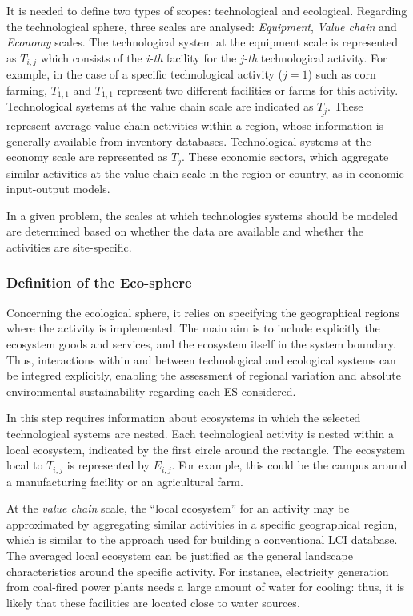 \documentclass[
  14pt,
]{extarticle}
\begin{document}
It is needed to define two types of scopes: technological and ecological.
Regarding the technological sphere, three scales are analysed: \emph{Equipment}, \emph{Value chain} and \emph{Economy} scales.
The technological system at the equipment scale is represented as \(T_{i,j}\) which consists of the \emph{i-th} facility for the \emph{j-th} technological activity.
For example, in the case of a specific technological activity (\(j = 1\)) such as corn farming, \(T_{1,1}\) and \(T_{1,1}\) represent two different facilities or farms for this activity.
Technological systems at the value chain scale are indicated as \(\underline{T_{j}}\).
These represent average value chain activities within a region, whose information is generally available from inventory databases.
Technological systems at the economy scale are represented as \(\overline{T_{j}}\).
These economic sectors, which aggregate similar activities at the value chain scale in the region or country, as in economic input-output models.

In a given problem, the scales at which technologies systems should be modeled are determined based on whether the data are available and whether the activities are site-specific.

\hypertarget{definition-of-the-eco-sphere}{%
\subsubsection{Definition of the Eco-sphere}\label{definition-of-the-eco-sphere}}

Concerning the ecological sphere, it relies on specifying the geographical regions where the activity is implemented.
The main aim is to include explicitly the ecosystem goods and services, and the ecosystem itself in the system boundary.
Thus, interactions within and between technological and ecological systems can be integred explicitly, enabling the assessment of regional variation and absolute environmental sustainability regarding each ES considered.

In this step requires information about ecosystems in which the selected technological systems are nested.
Each technological activity is nested within a local ecosystem, indicated by the first circle around the rectangle.
The ecosystem local to \(T_{i,j}\) is represented by \(E_{i,j}\).
For example, this could be the campus around a manufacturing facility or an agricultural farm.

At the \emph{value chain} scale, the ``local ecosystem'' for an activity may be approximated by aggregating similar activities in a specific geographical region, which is similar to the approach used for building a conventional LCI database.
The averaged local ecosystem can be justified as the general landscape characteristics around the specific activity.
For instance, electricity generation from coal-fired power plants needs a large amount of water for cooling: thus, it is likely that these facilities are located close to water sources.
\end{document}
